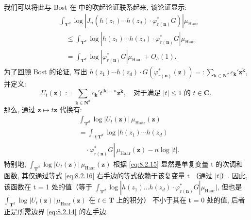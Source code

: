 我们可以将此与 Bost 在 \cite[引理 4.13 中的等式 (4.28)]{Bos01} 中的吹起论证联系起来, 该论证显示:
\begin{equation}\label{eq:8.2.14}
\begin{aligned}
&\int_{\mathbf{T}^d} \log \left| J_n \left( h(z_1) \cdots h(z_d) \cdot \varphi_{r(\mathbf{n})}^* G \right) \right| \mu_{\text{Haar}} \\
&\quad \leq \int_{\mathbf{T}^d} \log \left| h(z_1) \cdots h(z_d) \cdot \varphi_{r(\mathbf{n})}^* G \right| \mu_{\text{Haar}} \\
&\quad = \int_{\mathbf{T}^d} \log \left| \varphi_{r(\mathbf{n})}^* G \right| \mu_{\text{Haar}} + O_h(1).
\end{aligned}
\end{equation}
为了回顾 Bost 的论证, 写出 \(h(z_1) \cdots h(z_d) \cdot G(\varphi_{r(\mathbf{n})}^*(\mathbf{z})) =: \sum_{\mathbf{k} \in \mathbf{N}^d} c_{\mathbf{k}}' \mathbf{z}^{\mathbf{k}}\), 并定义:
\begin{equation}\label{eq:8.2.15}
U_t(\mathbf{z}) := \sum_{\mathbf{k} \in \mathbf{N}^d} c_{\mathbf{k}}' t^{|\mathbf{k}| - n} \mathbf{z}^{\mathbf{k}}, \quad \text{对于满足 } |t| \le 1 \text{ 的 } t \in \mathbf{C}.
\end{equation}
那么, 通过 \(\mathbf{z} \mapsto t\mathbf{z}\) 代换有:
\begin{equation}\label{eq:8.2.16}
\begin{aligned}
&\int_{\mathbf{T}^d} \log |U_t(\mathbf{z})| \, \mu_{\text{Haar}}(\mathbf{z}) \\
&= \int_{|t|\mathbf{T}^d} \log \left| h(z_1) \cdots h(z_d) \right. \\
&\quad \cdot \left. \varphi_{r(\mathbf{n})}^* G \right| \, \mu_{\text{Haar}}(\mathbf{z}) - n \log |t|.
\end{aligned}
\end{equation}
特别地, \(\int_{\mathbf{T}^d} \log |U_t(\mathbf{z})| \, \mu_{\text{Haar}}(\mathbf{z})\) 根据 \eqref{eq:8.2.15} 
显然是单复变量 t 的次调和函数, 
其仅通过等式 \eqref{eq:8.2.16} 右手边的等式依赖于该复变量 t （通过 \(|t|\)）. 
因此, 该函数在 t = 1 处的值（等于 \(\int_{\mathbf{T}^d} \log |h(z_1) \dots h(z_d) \cdot \varphi_{r(\mathbf{n})}^* G |\mu_{\text{Haar}}|\), 
但也是 \(\int_{\mathbf{T}^d} \log |U_t(\mathbf{z})| \, \mu_{\text{Haar}}(\mathbf{z})\) 在 \(t \in \mathbf{T}\) 上的积分） 
不小于其在 t = 0 处的值, 
后者正是所需边界 \eqref{eq:8.2.14} 的左手边.

